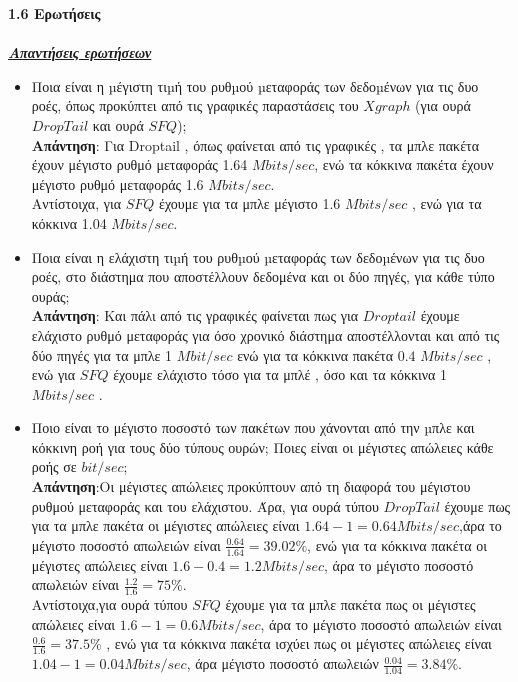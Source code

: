 \documentclass{article}%
\begin{document}
\textbf{1.6 Ερωτήσεις} \\\\
\textsl{\textbf{\underline{{Απαντήσεις ερωτήσεων}}}}
\begin{itemize}
	\item Ποια είναι η µέγιστη τιµή του ρυθµού µεταφοράς των δεδοµένων για τις δυο ροές, όπως προκύπτει
από τις γραφικές παραστάσεις του $Xgraph$ (για ουρά $DropTail$ και ουρά $SFQ$);\\
\textbf{Απάντηση}: Για \textlatin{Droptail} , όπως φαίνεται από τις γραφικές , τα μπλε πακέτα έχουν μέγιστο ρυθμό μεταφοράς 1.64 $Mbits/sec$, ενώ τα κόκκινα πακέτα έχουν μέγιστο ρυθμό μεταφοράς 1.6 $Mbits/sec$. \\Αντίστοιχα, για $SFQ$ έχουμε για τα μπλε μέγιστο 1.6 $Mbits/sec$ , ενώ για τα κόκκινα 1.04 $Mbits/sec$. \\
\item Ποια είναι η ελάχιστη τιµή του ρυθµού µεταφοράς των δεδοµένων για τις δυο ροές, στο διάστημα
που αποστέλλουν δεδομένα και οι δύο πηγές, για κάθε τύπο ουράς;\\ 
\textbf{Απάντηση}: Και πάλι από τις γραφικές φαίνεται πως για $Droptail$ έχουμε ελάχιστο ρυθμό μεταφοράς για όσο χρονικό διάστημα αποστέλλονται και από τις δύο πηγές  για τα μπλε 1 $Mbit/sec$ ενώ για τα κόκκινα πακέτα $0.4$ $Mbits/sec$ , ενώ για $SFQ$ έχουμε ελάχιστο τόσο για τα μπλέ , όσο και τα κόκκινα 1 $Mbits/sec$ . \\
\item Ποιο είναι το μέγιστο ποσοστό των πακέτων που χάνονται από την µπλε και κόκκινη ροή για τους
δύο τύπους ουρών; Ποιες είναι οι μέγιστες απώλειες κάθε ροής σε $bit/sec$;\\
\textbf{Απάντηση}:Οι μέγιστες απώλειες προκύπτουν από τη διαφορά του μέγιστου ρυθμού μεταφοράς και του ελάχιστου. Άρα, για ουρά τύπου $DropTail$ έχουμε πως για τα μπλε πακέτα οι μέγιστες απώλειες είναι $1.64-1=0.64 Mbits/sec$,άρα το μέγιστο ποσοστό απωλειών είναι $\frac{0.64}{1.64}=39.02\%$, ενώ για τα κόκκινα πακέτα οι μέγιστες απώλειες είναι $1.6-0.4=1.2 Mbits/sec$, άρα το μέγιστο ποσοστό απωλειών είναι $\frac{1.2}{1.6}=75\%$.\\Αντίστοιχα,για ουρά τύπου $SFQ$ έχουμε για τα μπλε πακέτα πως οι μέγιστες απώλειες είναι $1.6-1=0.6 Mbits/sec$, άρα το μέγιστο ποσοστό απωλειών είναι $\frac{0.6}{1.6}=37.5\%$ , ενώ για τα κόκκινα πακέτα ισχύει πως οι μέγιστες απώλειες είναι $1.04-1=0.04 Mbits/sec$, άρα μέγιστο ποσοστό απωλειών $\frac{0.04}{1.04}=3.84\%$.\\ 


\end{itemize}
\end{document}

